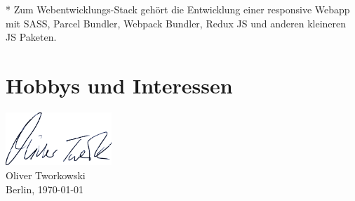 \documentclass[11pt, a4paper]{moderncv}
\newcommand{\inq}[1]{
	\glqq{#1}\grqq{}
}
\begin{document}
* Zum Webentwicklungs-Stack gehört die Entwicklung einer responsive Webapp mit SASS, Parcel Bundler, Webpack Bundler, Redux JS und anderen kleineren JS Paketen.
	
	\newpage
	\section{Hobbys und Interessen}
	
	\vfill  %
	\includegraphics[height=2cm, keepaspectratio=true]{abb/US_OT.png}\\
	Oliver Tworkowski\\
	Berlin, \today
	
%	
\end{document}
